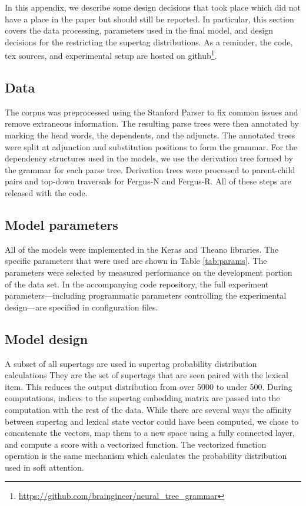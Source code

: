 \documentclass[11pt]{article}
\begin{document}
In this appendix, we describe some design decisions that took place which did not have a place in the paper but should still be reported.  In particular, this section covers the data processing, parameters used in the final model, and design decisions for the restricting the supertag distributions. As a reminder, the code, tex sources, and experimental setup are hosted on github\footnote{\url{https://github.com/braingineer/neural_tree_grammar}}.

\subsection{Data}

The corpus was preprocessed using the Stanford Parser to fix common issues and remove extraneous information.  The resulting parse trees were then annotated by marking the head words, the dependents, and the adjuncts.  The annotated trees were split at adjunction and substitution positions to form the grammar.  For the dependency structures used in the models, we use the derivation tree formed by the grammar for each parse tree.  Derivation trees were processed to parent-child pairs and top-down traversals for Fergus-N and Fergus-R.  All of these steps are released with the code. 

\subsection{Model parameters}

All of the models were implemented in the Keras \cite{chollet2015keras} and Theano \cite{theano} libraries.  The specific parameters that were used are shown in Table \ref{tab:params}.  The parameters were selected by measured performance on the development portion of the data set.  In the accompanying code repository, the full experiment parameters---including programmatic parameters controlling the experimental design---are specified in configuration files. 

\subsection{Model design}
A subset of all supertags are used in supertag probability distribution calculations
%
They are the set of supertags that are seen paired with the lexical item.
%
This reduces the output distribution from over 5000 to under 500.  
%
During computations, indices to the supertag embedding matrix are passed into the computation with the rest of the data. 
%
While there are several ways the affinity between supertag and lexical state vector could have been computed, we chose to concatenate the vectors, map them to a new space using a fully connected layer, and compute a score with a vectorized function.
%
The vectorized function operation is the same mechanism which calculates the probability distribution used in soft attention. 
 

\newpage


\end{document}
